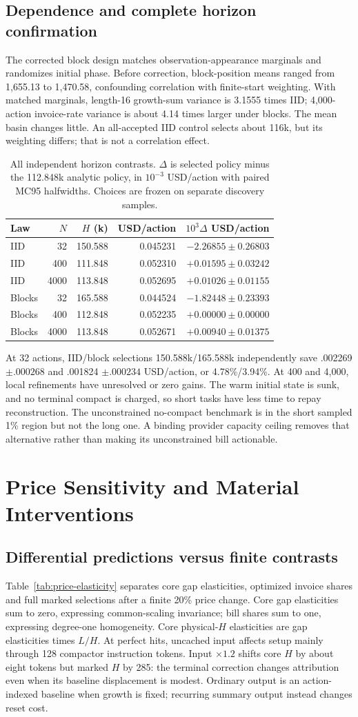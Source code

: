 \documentclass[sigconf,screen,nonacm]{acmart}
\makeatletter
\newcommand{\PaperHorizonConfirmation}{%
\begin{tabular}{@{}lrrrr@{}}\toprule
Law & $N$ & $H$ (k) & USD/action & $10^3\Delta$ USD/action\\\midrule
IID & 32 & 150.588 & 0.045231 & $-2.26855\pm0.26803$\\
IID & 400 & 111.848 & 0.052310 & $+0.01595\pm0.03242$\\
IID & 4000 & 113.848 & 0.052695 & $+0.01026\pm0.01155$\\
Blocks & 32 & 165.588 & 0.044524 & $-1.82448\pm0.23393$\\
Blocks & 400 & 112.848 & 0.052235 & $+0.00000\pm0.00000$\\
Blocks & 4000 & 113.848 & 0.052671 & $+0.00940\pm0.01375$\\\bottomrule
\end{tabular}}
\makeatother
\begin{document}
\subsection{Dependence and complete horizon confirmation}
The corrected block design matches observation-appearance marginals and
randomizes initial phase. Before correction, block-position means ranged
from 1,655.13 to 1,470.58, confounding correlation with finite-start
weighting. With matched marginals, length-16 growth-sum variance is
3.1555 times IID; 4,000-action invoice-rate variance is about 4.14 times
larger under blocks. The mean basin changes little. An all-accepted IID
control selects about 116k, but its weighting differs; that is not a
correlation effect.

\begin{table}[t]
\centering\small
\caption{All independent horizon contrasts. $\Delta$ is selected policy
minus the 112.848k analytic policy, in $10^{-3}$ USD/action with paired
MC95 halfwidths. Choices are frozen on separate discovery samples.}
\label{tab:horizon-confirmation}\PaperHorizonConfirmation
\end{table}

At 32 actions, IID/block selections 150.588k/165.588k independently save
.002269 $\pm .000268$ and .001824 $\pm .000234$ USD/action, or
4.78\%/3.94\%. At 400 and 4,000, local refinements have unresolved
or zero gains. The warm initial state is sunk, and no terminal compact
is charged, so short tasks have less time to repay reconstruction.
The unconstrained no-compact benchmark is in the short sampled 1\%
region but not the long one. A binding provider capacity ceiling removes
that alternative rather than making its unconstrained bill actionable.

\section{Price Sensitivity and Material Interventions}
\label{app:price-experiments}

\subsection{Differential predictions versus finite contrasts}
Table~\ref{tab:price-elasticity} separates core gap elasticities,
optimized invoice shares and full marked selections after a finite 20\%
price change. Core gap elasticities sum to zero, expressing common-scaling
invariance; bill shares sum to one, expressing degree-one homogeneity.
Core physical-$H$ elasticities are gap elasticities times $L/H$.
At perfect hits, uncached input affects setup mainly through 128 compactor
instruction tokens. Input $\times1.2$ shifts core $H$ by about eight
tokens but marked $H$ by 285: the terminal correction changes attribution
even when its baseline displacement is modest. Ordinary output is an
action-indexed baseline when growth is fixed; recurring summary output
instead changes reset cost.
\end{document}
